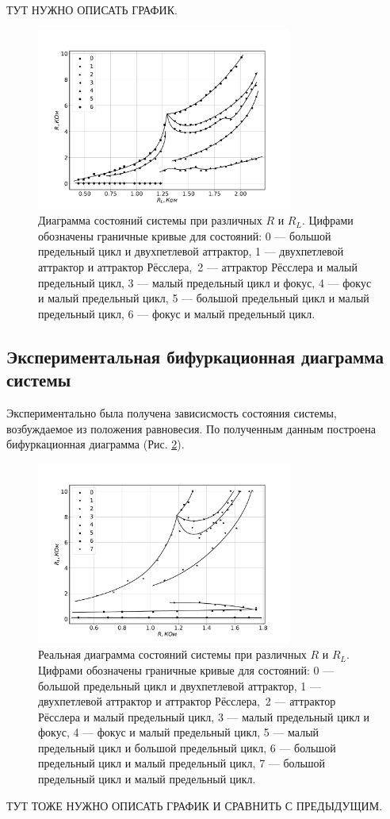 \documentclass[12pt]{article}
\begin{document}
ТУТ НУЖНО ОПИСАТЬ ГРАФИК.
\begin{figure}[H]
	\centering
	\includegraphics[width=0.75\textwidth]{bif_diag_teor.pdf}
	\caption{Диаграмма состояний системы при различных $R$ и $R_L$. 
	Цифрами обозначены граничные кривые для состояний: 
	0 --- большой предельный цикл и двухпетлевой аттрактор,
	1 --- двухпетлевой аттрактор и аттрактор Рёсслера,\
	2 --- аттрактор Рёсслера и малый предельный цикл,
	3 --- малый предельный цикл и фокус, 
	4 --- фокус и малый предельный цикл, 
	5 --- большой предельный цикл и малый предельный цикл,
	6 --- фокус и малый предельный цикл.}
	\label{fig:phase_diag_teor}
\end{figure}

\subsection*{Экспериментальная бифуркационная диаграмма системы}
Экспериментально была получена зависисмость состояния системы, возбуждаемое из положения равновесия. По 
полученным данным построена бифуркационная диаграмма (Рис. \ref{fig:real_bif_diag}). 
\begin{figure}[H]
	\centering
	\includegraphics[width=0.75\textwidth]{bif_diag_lines.pdf}
	\caption{Реальная диаграмма состояний системы при различных $R$ и $R_L$. 
	Цифрами обозначены граничные кривые для состояний: 
	0 --- большой предельный цикл и двухпетлевой аттрактор,
	1 --- двухпетлевой аттрактор и аттрактор Рёсслера,\
	2 --- аттрактор Рёсслера и малый предельный цикл,
	3 --- малый предельный цикл и фокус, 
	4 --- фокус и малый предельный цикл, 
	5 --- малый предельный цикл и большой предельный цикл,
	6 --- большой предельный цикл и малый предельный цикл,
	7 --- большой предельный цикл и малый предельный цикл.}
	\label{fig:real_bif_diag}
\end{figure}
ТУТ ТОЖЕ НУЖНО ОПИСАТЬ ГРАФИК И СРАВНИТЬ С ПРЕДЫДУЩИМ.
\end{document}
